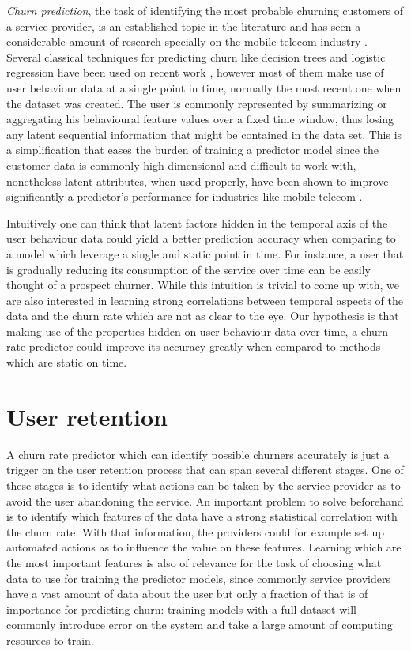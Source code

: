 \documentclass{kththesis}
\begin{document}
	\emph{Churn prediction}, the task of identifying the most probable churning customers of a service provider, is an established topic in the literature and has seen a considerable amount of research specially on the mobile telecom industry \citep{Hassouna2015} \citep{Lu2014} \citep{Khan2015}.  Several classical techniques for predicting churn like decision trees and logistic regression have been used on recent work \citep{mahajan2015review}, however most of them make use of user behaviour data at a single point in time, normally the most recent one when the dataset was created. The user is commonly represented by summarizing or aggregating his behavioural feature values over a fixed time window, thus losing any latent sequential information that might be contained in the data set. This is a simplification that eases the burden of training a predictor model since the customer data is commonly high-dimensional and difficult to work with, nonetheless latent attributes, when used properly, have been shown to improve significantly a predictor's performance for industries like mobile telecom \citep{GurAli2014}.
    
    Intuitively one can think that latent factors hidden in the temporal axis of the user behaviour data could yield a better prediction accuracy when comparing to a model which leverage a single and static point in time. For instance, a user that is gradually reducing its consumption of the service over time can be easily thought of a prospect churner. While this intuition is trivial to come up with, we are also interested in learning strong correlations between temporal aspects of the data and the churn rate which are not as clear to the eye. Our hypothesis is that making use of the properties hidden on user behaviour data over time, a churn rate predictor could improve its accuracy greatly when compared to methods which are static on time.
    
\section{User retention}    
    
A churn rate predictor which can identify possible churners accurately is just a trigger on the user retention process that can span several different stages. One of these stages is to identify what actions can be taken by the service provider as to avoid the user abandoning the service. An important problem to solve beforehand is to identify which features of the data have a strong statistical correlation with the churn rate. With that information, the providers could for example set up automated actions as to influence the value on these features. Learning which are the most important features is also of relevance for the task of choosing what data to use for training the predictor models, since commonly service providers have a vast amount of data about the user but only a fraction of that is of importance for predicting churn: training models with a full dataset will commonly introduce error on the system and take a large amount of computing resources to train.
	
\end{document}
